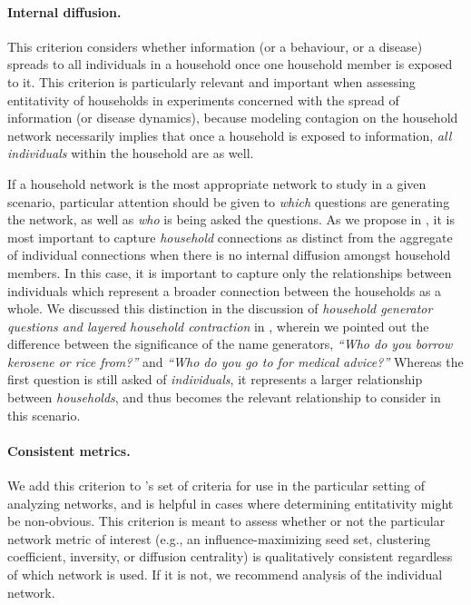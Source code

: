 \paragraph{Internal diffusion.} This criterion considers whether information (or a behaviour, or a disease) spreads to all individuals in a household once one household member is exposed to it. This criterion is particularly relevant and important when assessing entitativity of households in experiments concerned with the spread of information (or disease dynamics), because modeling contagion on the household network necessarily implies that once a household is exposed to information, \textit{all individuals} within the household are as well. 

If a household network is the most appropriate network to study in a given scenario, particular attention should be given to \textit{which} questions are generating the network, as well as \textit{who} is being asked the questions. As we propose in , it is most important to capture \textit{household} connections as distinct from the aggregate of individual connections when there is no internal diffusion amongst household members. In this case, it is important to capture only the relationships between individuals which represent a broader connection between the households as a whole. We discussed this distinction in the discussion of \textit{household generator questions and layered household contraction} in , wherein we pointed out the difference between the significance of the name generators, \textit{``Who do you borrow kerosene or rice from?''} and \textit{``Who do you go to for medical advice?''} Whereas the first question is still asked of \textit{individuals}, it represents a larger relationship between \textit{households}, and thus becomes the relevant relationship to consider in this scenario. 

\paragraph{Consistent metrics.} We add this criterion to \citeauthor{campbell1958common}'s set of criteria for use in the particular setting of analyzing networks, and is helpful in cases where determining entitativity might be non-obvious. This criterion is meant to assess whether or not the particular network metric of interest (e.g., an influence-maximizing seed set, clustering coefficient, inversity, or diffusion centrality) is qualitatively consistent regardless of which network is used. If it is not, we recommend analysis of the individual network. 


